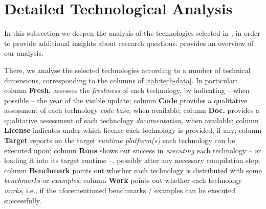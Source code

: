 \documentclass[12pt,a4paper,openright,twoside]{book}
\begin{document}






%

\section{Detailed Technological Analysis}\label{sec:table-evaluation}



In this subsection we deepen the analysis of the technologies selected in \cite{lptech4mas-jaamas35}, in order to provide additional insights about research questions.
%
 provides an overview of our analysis.

There, we analyse the selected technologies according to a number of technical dimensions, corresponding to the columns of \cref{tab:tech-data}.
%
In particular:
column \textbf{Fresh.} assesses the \emph{freshness} of each technology, by indicating -- when possible -- the year of the visible update;
column \textbf{Code} provides a qualitative assessment of each technology \emph{code base}, when available;
column \textbf{Doc.} provides a qualitative assessment of each technology \emph{documentation}, when available;
column \textbf{License} indicates under which license each technology is provided, if any;
column \textbf{Target} reports on the target \emph{runtime platform(s)} each technology can be executed upon;
column \textbf{Runs} shows our success in \emph{executing} each technology -- or loading it into its target runtime --, possibly after any necessary compilation step;
column \textbf{Benchmark} points out whether each technology is distributed with some \emph{benchmarks} or \emph{examples};
column \textbf{Work} points out whether each technology \emph{works}, i.e., if the aforementioned benchmarks / examples can be executed successfully.
\end{document}
